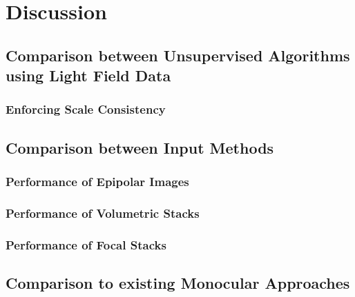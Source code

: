 \chapter{Discussion}

\section{Comparison between Unsupervised Algorithms using Light Field Data}
\subsection{Enforcing Scale Consistency}

\section{Comparison between Input Methods}
\subsection{Performance of Epipolar Images}
\subsection{Performance of Volumetric Stacks}
\subsection{Performance of Focal Stacks}

\section{Comparison to existing Monocular Approaches}

